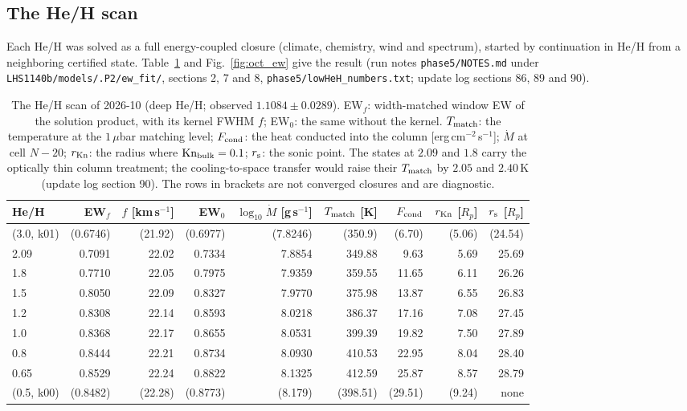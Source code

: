 \documentclass[english,a4paper]{my_memo}
\begin{document}
\subsection{The He/H scan}
\label{sec:oct_scan}

Each He/H was solved as a full energy-coupled closure (climate, chemistry,
wind and spectrum), started by continuation in He/H from a neighboring
certified state. Table~\ref{tab:oct_scan} and Fig.~\ref{fig:oct_ew} give the
result (run notes \texttt{phase5/NOTES.md} under
\texttt{LHS1140b/models/.P2/ew\_fit/}, sections 2, 7
and 8, \texttt{phase5/lowHeH\_numbers.txt}; update log sections 86, 89
and 90).

\begin{table}[htbp]\centering\small
\caption{The He/H scan of 2026-10 (deep He/H; observed $1.1084 \pm 0.0289$).
EW$_f$: width-matched window EW of the solution product, with its kernel
FWHM $f$; EW$_0$: the same without the kernel. $T_{\rm match}$: the
temperature at the $1\,\mu$bar matching level; $F_{\rm cond}$: the heat
conducted into the column [erg\,cm$^{-2}$\,s$^{-1}$]; $\dot M$ at cell
$N-20$; $r_{\rm Kn}$: the radius where $\mathrm{Kn}_{\rm bulk} = 0.1$;
$r_{\rm s}$: the sonic point. The states at $2.09$ and $1.8$ carry the
optically thin column treatment; the cooling-to-space transfer would raise
their $T_{\rm match}$ by $2.05$ and $2.40$\,K (update log section 90). The
rows in brackets are not converged closures and are diagnostic.}
\label{tab:oct_scan}
\begin{tabular}{lrrrrrrrr}
\toprule
He/H & EW$_f$ & $f$ [km\,s$^{-1}$] & EW$_0$ & $\log_{10}\dot M$ [g\,s$^{-1}$] &
$T_{\rm match}$ [K] & $F_{\rm cond}$ & $r_{\rm Kn}$ [$R_p$] & $r_{\rm s}$ [$R_p$] \\
\midrule
(3.0, k01) & (0.6746) & (21.92) & (0.6977) & (7.8246) & (350.9) & (6.70) & (5.06) & (24.54) \\
2.09 & 0.7091 & 22.02 & 0.7334 & 7.8854 & 349.88 & 9.63 & 5.69 & 25.69 \\
1.8  & 0.7710 & 22.05 & 0.7975 & 7.9359 & 359.55 & 11.65 & 6.11 & 26.26 \\
1.5  & 0.8050 & 22.09 & 0.8327 & 7.9770 & 375.98 & 13.87 & 6.55 & 26.83 \\
1.2  & 0.8308 & 22.14 & 0.8593 & 8.0218 & 386.37 & 17.16 & 7.08 & 27.45 \\
1.0  & 0.8368 & 22.17 & 0.8655 & 8.0531 & 399.39 & 19.82 & 7.50 & 27.89 \\
0.8  & 0.8444 & 22.21 & 0.8734 & 8.0930 & 410.53 & 22.95 & 8.04 & 28.40 \\
0.65 & 0.8529 & 22.24 & 0.8822 & 8.1325 & 412.59 & 25.87 & 8.57 & 28.79 \\
(0.5, k00) & (0.8482) & (22.28) & (0.8773) & (8.179) & (398.51) & (29.51) & (9.24) & none \\
\bottomrule
\end{tabular}
\end{table}
\end{document}
